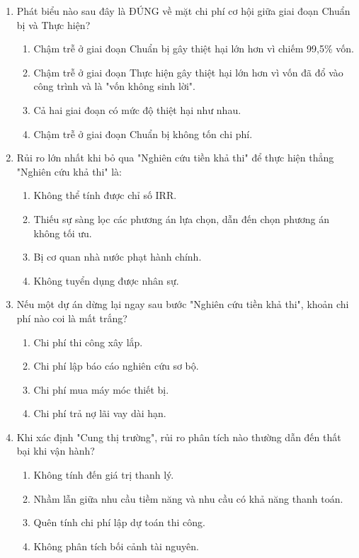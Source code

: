 \begin{enumerate}[label=\textbf{Câu \arabic*:}, leftmargin=*]
\item Phát biểu nào sau đây là ĐÚNG về mặt chi phí cơ hội giữa giai đoạn Chuẩn bị và Thực hiện?
\begin{enumerate}[label=\Alph*.]
    \item Chậm trễ ở giai đoạn Chuẩn bị gây thiệt hại lớn hơn vì chiếm 99,5\% vốn.
    \item Chậm trễ ở giai đoạn Thực hiện gây thiệt hại lớn hơn vì vốn đã đổ vào công trình và là "vốn không sinh lời".
    \item Cả hai giai đoạn có mức độ thiệt hại như nhau.
    \item Chậm trễ ở giai đoạn Chuẩn bị không tốn chi phí.
\end{enumerate}

\item Rủi ro lớn nhất khi bỏ qua "Nghiên cứu tiền khả thi" để thực hiện thẳng "Nghiên cứu khả thi" là:
\begin{enumerate}[label=\Alph*.]
    \item Không thể tính được chỉ số IRR.
    \item Thiếu sự sàng lọc các phương án lựa chọn, dẫn đến chọn phương án không tối ưu.
    \item Bị cơ quan nhà nước phạt hành chính.
    \item Không tuyển dụng được nhân sự.
\end{enumerate}

\item Nếu một dự án dừng lại ngay sau bước "Nghiên cứu tiền khả thi", khoản chi phí nào coi là mất trắng?
\begin{enumerate}[label=\Alph*.]
    \item Chi phí thi công xây lắp.
    \item Chi phí lập báo cáo nghiên cứu sơ bộ.
    \item Chi phí mua máy móc thiết bị.
    \item Chi phí trả nợ lãi vay dài hạn.
\end{enumerate}

\item Khi xác định "Cung thị trường", rủi ro phân tích nào thường dẫn đến thất bại khi vận hành?
\begin{enumerate}[label=\Alph*.]
    \item Không tính đến giá trị thanh lý.
    \item Nhầm lẫn giữa nhu cầu tiềm năng và nhu cầu có khả năng thanh toán.
    \item Quên tính chi phí lập dự toán thi công.
    \item Không phân tích bối cảnh tài nguyên.
\end{enumerate}


\end{enumerate}
